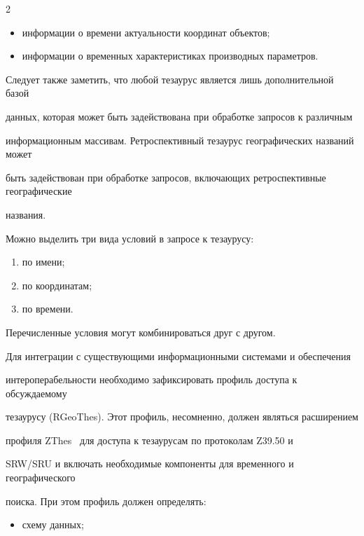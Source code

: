 \begin{multicols}{2}
\begin{itemize}
\item информации о времени актуальности координат объектов;

\item информации о временных характеристиках производных параметров.

\end{itemize}



  Следует также заметить, что любой тезаурус является лишь дополнительной базой 

данных, которая может быть задействована при обработке запросов к различным 

информационным массивам. Ретроспективный тезаурус географических названий может 

быть задействован при обработке запросов, включающих ретроспективные географические 

названия.

  

  Можно выделить три вида условий в запросе к тезаурусу:

  \begin{enumerate}[(1)]

\item по имени;

\item по координатам;

\item по времени.

\end{enumerate}



  Перечисленные условия могут комбинироваться друг с другом. 

  

  Для интеграции с существующими информационными системами и обеспечения 

интероперабельности необходимо зафиксировать профиль доступа к обсуждаемому 

тезаурусу ({RGeoThes}). Этот профиль, несомненно, должен являться расширением 

профиля {ZThes}~\cite{4-sk} для доступа к тезаурусам по протоколам Z39.50 и 

{SRW/SRU} и включать необходимые компоненты для временного и географического 

поиска. При этом профиль должен определять:

  \begin{itemize}

\item схему данных;


\end{itemize}
\end{multicols}
